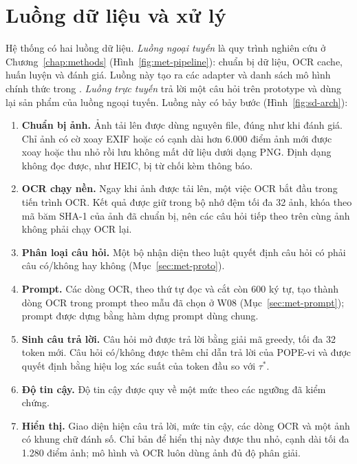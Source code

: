 \section{Luồng dữ liệu và xử lý}
\label{sec:sd-flow}

Hệ thống có hai luồng dữ liệu. \emph{Luồng ngoại tuyến} là quy trình nghiên cứu ở
Chương~\ref{chap:methods} (Hình~\ref{fig:met-pipeline}): chuẩn bị dữ liệu, OCR cache, huấn
luyện và đánh giá. Luồng này tạo ra các adapter và danh sách mô hình chính thức trong
. \emph{Luồng trực tuyến} trả lời một câu hỏi trên
prototype và dùng lại sản phẩm của luồng ngoại tuyến. Luồng này có bảy bước
(Hình~\ref{fig:sd-arch}):

\begin{enumerate}
  \item \textbf{Chuẩn bị ảnh.} Ảnh tải lên được dùng nguyên file, đúng như khi đánh giá.
  Chỉ ảnh có cờ xoay EXIF hoặc có cạnh dài hơn 6.000 điểm ảnh mới được xoay hoặc thu nhỏ
  rồi lưu không mất dữ liệu dưới dạng PNG. Định dạng không đọc được, như HEIC, bị từ chối
  kèm thông báo.
  \item \textbf{OCR chạy nền.} Ngay khi ảnh được tải lên, một việc OCR bắt đầu trong tiến
  trình OCR. Kết quả được giữ trong bộ nhớ đệm tối đa 32 ảnh, khóa theo mã băm SHA-1 của
  ảnh đã chuẩn bị, nên các câu hỏi tiếp theo trên cùng ảnh không phải chạy OCR lại.
  \item \textbf{Phân loại câu hỏi.} Một bộ nhận diện theo luật quyết định câu hỏi có phải
  câu có/không hay không (Mục~\ref{sec:met-proto}).
  \item \textbf{Prompt.} Các dòng OCR, theo thứ tự đọc và cắt còn 600 ký tự, tạo thành
  dòng OCR trong prompt theo mẫu đã chọn ở W08 (Mục~\ref{sec:met-prompt}); prompt được
  dựng bằng hàm dựng prompt dùng chung.
  \item \textbf{Sinh câu trả lời.} Câu hỏi mở được trả lời bằng giải mã greedy, tối đa 32
  token mới. Câu hỏi có/không được thêm chỉ dẫn trả lời của POPE-vi và được quyết định bằng
  hiệu log xác suất của token đầu so với $\tau^*$.
  \item \textbf{Độ tin cậy.} Độ tin cậy được quy về một mức theo các ngưỡng đã kiểm chứng.
  \item \textbf{Hiển thị.} Giao diện hiện câu trả lời, mức tin cậy, các dòng OCR và một ảnh
  có khung chữ đánh số. Chỉ bản để hiển thị này được thu nhỏ, cạnh dài tối đa 1.280 điểm
  ảnh; mô hình và OCR luôn dùng ảnh đủ độ phân giải.
\end{enumerate}

